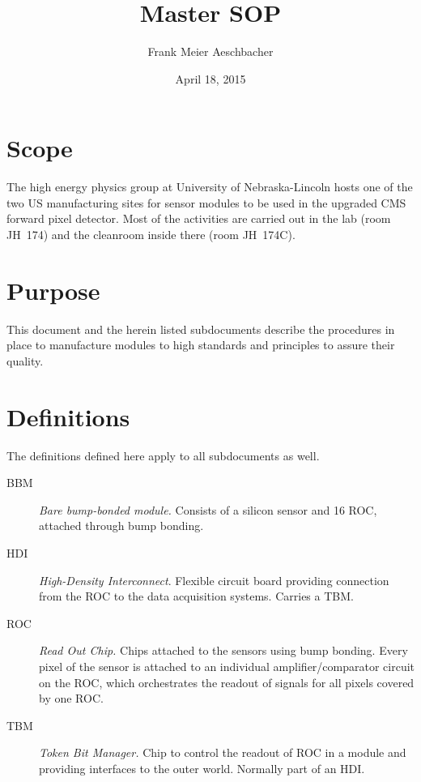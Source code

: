 \documentclass[12pt]{unlsilabsop}
\title{Master SOP}
\date{April 18, 2015}
\author{Frank Meier Aeschbacher}
\begin{document}
\maketitle

\section{Scope}
The high energy physics group at University of Nebraska-Lincoln hosts one of the two US manufacturing sites for sensor modules to be used in the upgraded CMS forward pixel detector. Most of the activities are carried out in the lab (room JH~174) and the cleanroom inside there (room JH~174C).

\section{Purpose}
This document and the herein listed subdocuments describe the procedures in place to manufacture modules to high standards and principles to assure their quality.

\section{Definitions}
The definitions defined here apply to all subdocuments as well.
\begin{description}
    \item[BBM] \emph{Bare bump-bonded module.} Consists of a silicon sensor and 16 ROC, attached through bump bonding.
    \item[HDI] \emph{High-Density Interconnect}. Flexible circuit board providing connection from the ROC to the data acquisition systems. Carries a TBM.
    \item[ROC] \emph{Read Out Chip.} Chips attached to the sensors using bump bonding. Every pixel of the sensor is attached to an individual amplifier/comparator circuit on the ROC, which orchestrates the readout of signals for all pixels covered by one ROC.
    \item[TBM] \emph{Token Bit Manager.} Chip to control the readout of ROC in a module and providing interfaces to the outer world. Normally part of an HDI.
\end{description}

\end{document}
